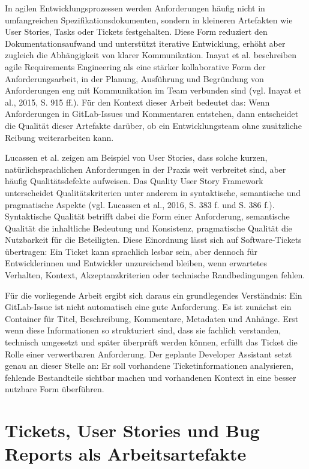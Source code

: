 \documentclass[12pt,a4paper,oneside]{scrreprt}
\begin{document}
In agilen Entwicklungsprozessen werden Anforderungen häufig nicht in umfangreichen Spezifikationsdokumenten, sondern in kleineren Artefakten wie User Stories, Tasks oder Tickets festgehalten. Diese Form reduziert den Dokumentationsaufwand und unterstützt iterative Entwicklung, erhöht aber zugleich die Abhängigkeit von klarer Kommunikation. Inayat et al. beschreiben agile Requirements Engineering als eine stärker kollaborative Form der Anforderungsarbeit, in der Planung, Ausführung und Begründung von Anforderungen eng mit Kommunikation im Team verbunden sind (vgl. Inayat et al., 2015, S. 915 ff.). Für den Kontext dieser Arbeit bedeutet das: Wenn Anforderungen in GitLab-Issues und Kommentaren entstehen, dann entscheidet die Qualität dieser Artefakte darüber, ob ein Entwicklungsteam ohne zusätzliche Reibung weiterarbeiten kann.

Lucassen et al. zeigen am Beispiel von User Stories, dass solche kurzen, natürlichsprachlichen Anforderungen in der Praxis weit verbreitet sind, aber häufig Qualitätsdefekte aufweisen. Das Quality User Story Framework unterscheidet Qualitätskriterien unter anderem in syntaktische, semantische und pragmatische Aspekte (vgl. Lucassen et al., 2016, S. 383 f. und S. 386 f.). Syntaktische Qualität betrifft dabei die Form einer Anforderung, semantische Qualität die inhaltliche Bedeutung und Konsistenz, pragmatische Qualität die Nutzbarkeit für die Beteiligten. Diese Einordnung lässt sich auf Software-Tickets übertragen: Ein Ticket kann sprachlich lesbar sein, aber dennoch für Entwicklerinnen und Entwickler unzureichend bleiben, wenn erwartetes Verhalten, Kontext, Akzeptanzkriterien oder technische Randbedingungen fehlen.

Für die vorliegende Arbeit ergibt sich daraus ein grundlegendes Verständnis: Ein GitLab-Issue ist nicht automatisch eine gute Anforderung. Es ist zunächst ein Container für Titel, Beschreibung, Kommentare, Metadaten und Anhänge. Erst wenn diese Informationen so strukturiert sind, dass sie fachlich verstanden, technisch umgesetzt und später überprüft werden können, erfüllt das Ticket die Rolle einer verwertbaren Anforderung. Der geplante Developer Assistant setzt genau an dieser Stelle an: Er soll vorhandene Ticketinformationen analysieren, fehlende Bestandteile sichtbar machen und vorhandenen Kontext in eine besser nutzbare Form überführen.

\section{Tickets, User Stories und Bug Reports als Arbeitsartefakte}
\end{document}
